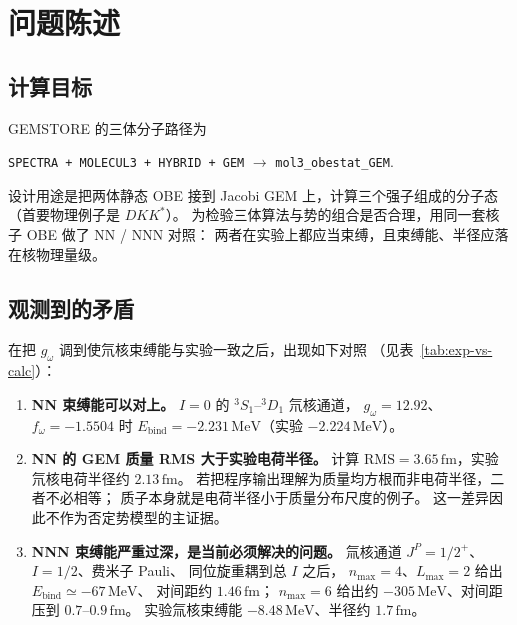 \documentclass[12pt,a4paper]{article}
\newcommand{\MeV}{\,\mathrm{MeV}}
\newcommand{\fm}{\,\mathrm{fm}}
\begin{document}
\section{问题陈述}

\subsection{计算目标}

GEMSTORE 的三体分子路径为
\begin{center}
\texttt{SPECTRA + MOLECUL3 + HYBRID + GEM} $\to$ \texttt{mol3\_obestat\_GEM}.
\end{center}
设计用途是把两体静态 OBE 接到 Jacobi GEM 上，计算三个强子组成的分子态
（首要物理例子是 $DKK^*$）。
为检验三体算法与势的组合是否合理，用同一套核子 OBE 做了 NN / NNN 对照：
两者在实验上都应当束缚，且束缚能、半径应落在核物理量级。

\subsection{观测到的矛盾}

在把 $g_\omega$ 调到使氘核束缚能与实验一致之后，出现如下对照
（见表~\ref{tab:exp-vs-calc}）：

\begin{enumerate}
  \item \textbf{NN 束缚能可以对上。}
        $I=0$ 的 ${}^3S_1$--${}^3D_1$ 氘核通道，
        $g_\omega=12.92$、$f_\omega=-1.5504$ 时
        $E_{\mathrm{bind}}=-2.231\MeV$（实验 $-2.224\MeV$）。
  \item \textbf{NN 的 GEM 质量 RMS 大于实验电荷半径。}
        计算 $\mathrm{RMS}=3.65\fm$，实验氘核电荷半径约 $2.13\fm$。
        若把程序输出理解为质量均方根而非电荷半径，二者不必相等；
        质子本身就是电荷半径小于质量分布尺度的例子。
        这一差异因此不作为否定势模型的主证据。
  \item \textbf{NNN 束缚能严重过深，是当前必须解决的问题。}
        氚核通道 $J^P=1/2^+$、$I=1/2$、费米子 Pauli、
        同位旋重耦到总 $I$ 之后，
        $n_{\max}=4$、$L_{\max}=2$ 给出 $E_{\mathrm{bind}}\simeq -67\MeV$、
        对间距约 $1.46\fm$；
        $n_{\max}=6$ 给出约 $-305\MeV$、对间距压到 $0.7$--$0.9\fm$。
        实验氚核束缚能 $-8.48\MeV$、半径约 $1.7\fm$。
\end{enumerate}
\end{document}
